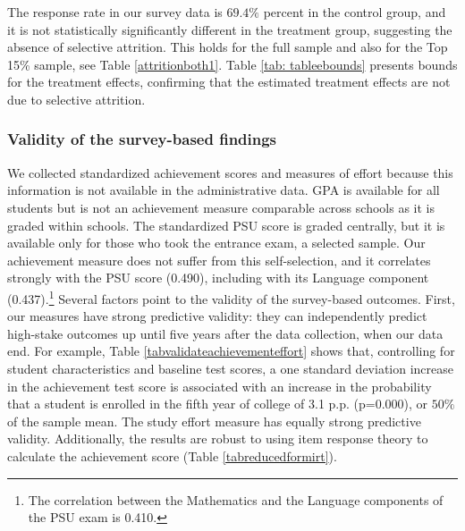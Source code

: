 The response rate in our survey data is $69.4\%$ percent in the control group, and it is not statistically significantly different in the treatment group, suggesting the absence of selective attrition. This holds for the full sample and also for the Top 15\% sample, see Table \ref{attritionboth1}.
Table \ref{tab: tableebounds} presents \cite{lee2009training} bounds for the treatment effects, confirming that the estimated treatment effects are not due to selective attrition. 








\subsubsection{Validity of the survey-based findings} \label{sec:predvalsurvey}

We collected standardized achievement scores and measures of effort because this information is not available in the administrative data. GPA is available for all students but is not an achievement measure comparable across schools as it is graded within schools. The standardized PSU score is graded centrally, but it is available only for those who took the entrance exam, a selected sample. Our achievement measure does not suffer from this self-selection, and it correlates strongly with the PSU score (0.490), including with its Language component (0.437).\footnote{The correlation between the Mathematics and the Language components of the PSU exam is 0.410.} Several factors point to the validity of the survey-based outcomes. First, our measures have strong predictive validity: they can independently predict high-stake outcomes up until five years after the data collection, when our data end. For example, Table \ref{tabvalidateachievementeffort}  shows that, controlling for student characteristics and baseline test scores, a one standard deviation increase in the achievement test score is associated with an increase in the probability that a student is enrolled in the fifth year of college of  3.1 p.p. (p=0.000), or $50\%$ of the sample mean. The study effort measure has equally strong predictive validity. Additionally, the results are robust to using item response theory to calculate the achievement score (Table \ref{tabreducedformirt}).\par  



